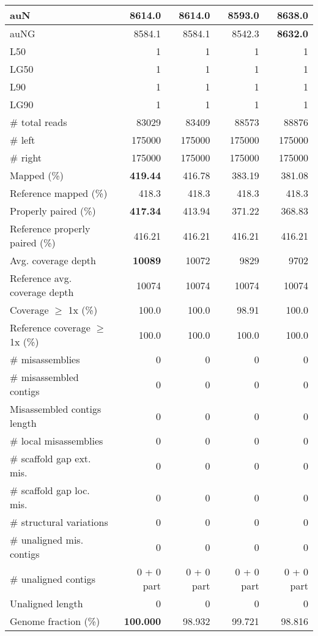 \documentclass[12pt,a4paper]{article}
\begin{document}
\begin{table}[ht]
\begin{center}
\begin{tabular}{|l*{4}{|r}|}
auN & 8614.0 & 8614.0 & 8593.0 & {\bf 8638.0} \\ \hline
auNG & 8584.1 & 8584.1 & 8542.3 & {\bf 8632.0} \\ \hline
L50 & 1 & 1 & 1 & 1 \\ \hline
LG50 & 1 & 1 & 1 & 1 \\ \hline
L90 & 1 & 1 & 1 & 1 \\ \hline
LG90 & 1 & 1 & 1 & 1 \\ \hline
\# total reads & 83029 & 83409 & 88573 & 88876 \\ \hline
\# left & 175000 & 175000 & 175000 & 175000 \\ \hline
\# right & 175000 & 175000 & 175000 & 175000 \\ \hline
Mapped (\%) & {\bf 419.44} & 416.78 & 383.19 & 381.08 \\ \hline
Reference mapped (\%) & 418.3 & 418.3 & 418.3 & 418.3 \\ \hline
Properly paired (\%) & {\bf 417.34} & 413.94 & 371.22 & 368.83 \\ \hline
Reference properly paired (\%) & 416.21 & 416.21 & 416.21 & 416.21 \\ \hline
Avg. coverage depth & {\bf 10089} & 10072 & 9829 & 9702 \\ \hline
Reference avg. coverage depth & 10074 & 10074 & 10074 & 10074 \\ \hline
Coverage $\geq$ 1x (\%) & 100.0 & 100.0 & 98.91 & 100.0 \\ \hline
Reference coverage $\geq$ 1x (\%) & 100.0 & 100.0 & 100.0 & 100.0 \\ \hline
\# misassemblies & 0 & 0 & 0 & 0 \\ \hline
\# misassembled contigs & 0 & 0 & 0 & 0 \\ \hline
Misassembled contigs length & 0 & 0 & 0 & 0 \\ \hline
\# local misassemblies & 0 & 0 & 0 & 0 \\ \hline
\# scaffold gap ext. mis. & 0 & 0 & 0 & 0 \\ \hline
\# scaffold gap loc. mis. & 0 & 0 & 0 & 0 \\ \hline
\# structural variations & 0 & 0 & 0 & 0 \\ \hline
\# unaligned mis. contigs & 0 & 0 & 0 & 0 \\ \hline
\# unaligned contigs & 0 + 0 part & 0 + 0 part & 0 + 0 part & 0 + 0 part \\ \hline
Unaligned length & 0 & 0 & 0 & 0 \\ \hline
Genome fraction (\%) & {\bf 100.000} & 98.932 & 99.721 & 98.816 \\ \hline

\end{tabular}
\end{center}
\end{table}
\end{document}
